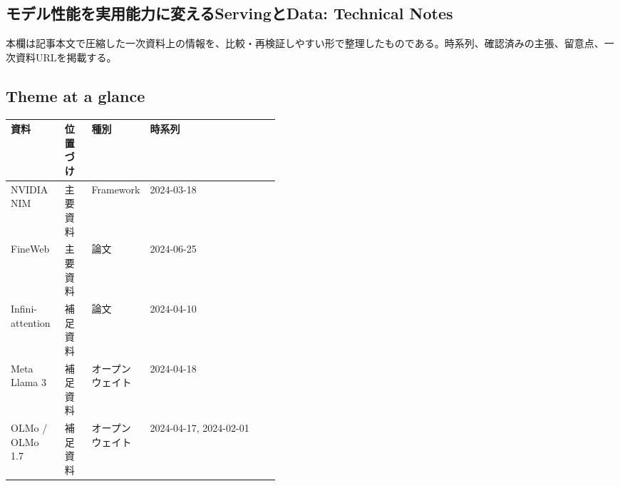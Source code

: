 \subsection*{モデル性能を実用能力に変えるServingとData: Technical Notes}
本欄は記事本文で圧縮した一次資料上の情報を、比較・再検証しやすい形で整理したものである。時系列、確認済みの主張、留意点、一次資料URLを掲載する。
\medskip
\subsection*{Theme at a glance}
\begin{center}
\footnotesize
\begin{tabularx}{\linewidth}{@{}p{0.20\linewidth}p{0.10\linewidth}p{0.14\linewidth}X@{}}
\toprule
資料 & 位置づけ & 種別 & 時系列 \\
\midrule
NVIDIA NIM & 主要資料 & Framework & 2024-03-18   \\
FineWeb & 主要資料 & 論文 & 2024-06-25   \\
Infini-attention & 補足資料 & 論文 & 2024-04-10   \\
Meta Llama 3 & 補足資料 & オープンウェイト & 2024-04-18   \\
OLMo / OLMo 1.7 & 補足資料 & オープンウェイト & 2024-04-17, 2024-02-01   \\
\bottomrule
\end{tabularx}
\end{center}
\normalsize

